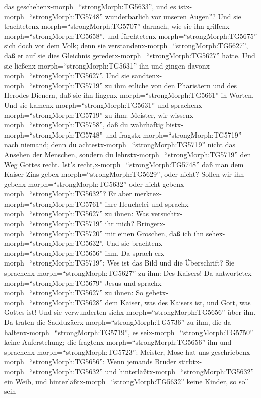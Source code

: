 das geschehenx-morph=``strongMorph:TG5633'', und es
istx-morph=``strongMorph:TG5748'' wunderbarlich vor unseren Augen''?
 Und sie trachtetenx-morph=``strongMorph:TG5707'' darnach,
wie sie ihn griffenx-morph=``strongMorph:TG5658'', und
fürchtetenx-morph=``strongMorph:TG5675'' sich doch vor dem Volk; denn
sie verstandenx-morph=``strongMorph:TG5627'', daß er auf sie dies
Gleichnis geredetx-morph=``strongMorph:TG5627'' hatte. Und sie
ließenx-morph=``strongMorph:TG5631'' ihn und gingen
davonx-morph=``strongMorph:TG5627''.  Und sie
sandtenx-morph=``strongMorph:TG5719'' zu ihm etliche von den Pharisäern
und des Herodes Dienern, daß sie ihn
fingenx-morph=``strongMorph:TG5661'' in Worten.  Und sie
kamenx-morph=``strongMorph:TG5631'' und
sprachenx-morph=``strongMorph:TG5719'' zu ihm: Meister, wir
wissenx-morph=``strongMorph:TG5758'', daß du wahrhaftig
bistx-morph=``strongMorph:TG5748'' und
fragstx-morph=``strongMorph:TG5719'' nach niemand; denn du
achtestx-morph=``strongMorph:TG5719'' nicht das Ansehen der Menschen,
sondern du lehrstx-morph=``strongMorph:TG5719'' den Weg Gottes recht.
Ist's recht,\textbar x-morph=``strongMorph:TG5748'' daß man dem Kaiser
Zins gebex-morph=``strongMorph:TG5629'', oder nicht? Sollen wir ihn
gebenx-morph=``strongMorph:TG5632'' oder nicht
gebenx-morph=``strongMorph:TG5632''?  Er aber
merktex-morph=``strongMorph:TG5761'' ihre Heuchelei und
sprachx-morph=``strongMorph:TG5627'' zu ihnen: Was
versuchtx-morph=``strongMorph:TG5719'' ihr mich?
Bringetx-morph=``strongMorph:TG5720'' mir einen Groschen, daß ich ihn
sehex-morph=``strongMorph:TG5632''.  Und sie
brachtenx-morph=``strongMorph:TG5656'' ihm. Da sprach
erx-morph=``strongMorph:TG5719'': Wes ist das Bild und die Überschrift?
Sie sprachenx-morph=``strongMorph:TG5627'' zu ihm: Des Kaisers!
 Da antwortetex-morph=``strongMorph:TG5679'' Jesus und
sprachx-morph=``strongMorph:TG5627'' zu ihnen: So
gebetx-morph=``strongMorph:TG5628'' dem Kaiser, was des Kaisers ist, und
Gott, was Gottes ist! Und sie verwunderten
sichx-morph=``strongMorph:TG5656'' über ihn.  Da traten die
Sadduzäerx-morph=``strongMorph:TG5736'' zu ihm, die da
haltenx-morph=``strongMorph:TG5719'', es
seix-morph=``strongMorph:TG5750'' keine Auferstehung; die
fragtenx-morph=``strongMorph:TG5656'' ihn und
sprachenx-morph=``strongMorph:TG5723'':  Meister, Mose hat
uns geschriebenx-morph=``strongMorph:TG5656'': Wenn jemands Bruder
stirbtx-morph=``strongMorph:TG5632'' und
hinterläßtx-morph=``strongMorph:TG5632'' ein Weib, und
hinterläßtx-morph=``strongMorph:TG5632'' keine Kinder, so soll sein
